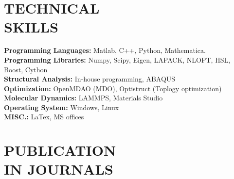 \documentclass[margin, 10pt]{res} %
\begin{document}
\begin{resume}
\begin{enumerate}
\begin{itemize}
    \end{itemize}
    
\end{enumerate}


\section{TECHNICAL \\ SKILLS} 

\textbf{Programming Languages:} Matlab, C++, Python, Mathematica. \\
\textbf{Programming Libraries:} Numpy, Scipy, Eigen, LAPACK, NLOPT, HSL, Boost, Cython \\
\textbf{ Structural Analysis:} In-house programming, ABAQUS \\
\textbf{ Optimization:} OpenMDAO (MDO), Optistruct (Toplogy optimization) \\
\textbf{ Molecular Dynamics:} LAMMPS, Materials Studio \\
\textbf{ Operating System:} Windows, Linux \\
\textbf{ MISC.:} LaTex, MS offices \\
 

 
\section{PUBLICATION \\ IN JOURNALS}


\end{resume}
\end{document}
